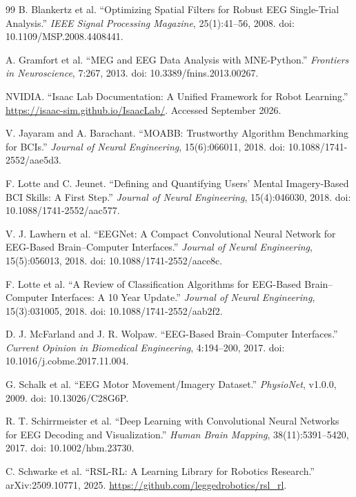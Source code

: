 \documentclass[11pt]{article}
\begin{document}
\begin{thebibliography}{99}\small
{}
B. Blankertz et al. ``Optimizing Spatial Filters for Robust EEG Single-Trial Analysis.'' \emph{IEEE Signal Processing Magazine}, 25(1):41--56, 2008. doi: 10.1109/MSP.2008.4408441.

A. Gramfort et al. ``MEG and EEG Data Analysis with MNE-Python.'' \emph{Frontiers in Neuroscience}, 7:267, 2013. doi: 10.3389/fnins.2013.00267.

NVIDIA. ``Isaac Lab Documentation: A Unified Framework for Robot Learning.'' \url{https://isaac-sim.github.io/IsaacLab/}. Accessed September 2026.

V. Jayaram and A. Barachant. ``MOABB: Trustworthy Algorithm Benchmarking for BCIs.'' \emph{Journal of Neural Engineering}, 15(6):066011, 2018. doi: 10.1088/1741-2552/aae5d3.

F. Lotte and C. Jeunet. ``Defining and Quantifying Users' Mental Imagery-Based BCI Skills: A First Step.'' \emph{Journal of Neural Engineering}, 15(4):046030, 2018. doi: 10.1088/1741-2552/aac577.

V. J. Lawhern et al. ``EEGNet: A Compact Convolutional Neural Network for EEG-Based Brain--Computer Interfaces.'' \emph{Journal of Neural Engineering}, 15(5):056013, 2018. doi: 10.1088/1741-2552/aace8c.

F. Lotte et al. ``A Review of Classification Algorithms for EEG-Based Brain--Computer Interfaces: A 10 Year Update.'' \emph{Journal of Neural Engineering}, 15(3):031005, 2018. doi: 10.1088/1741-2552/aab2f2.

D. J. McFarland and J. R. Wolpaw. ``EEG-Based Brain--Computer Interfaces.'' \emph{Current Opinion in Biomedical Engineering}, 4:194--200, 2017. doi: 10.1016/j.cobme.2017.11.004.

G. Schalk et al. ``EEG Motor Movement/Imagery Dataset.'' \emph{PhysioNet}, v1.0.0, 2009. doi: 10.13026/C28G6P.

R. T. Schirrmeister et al. ``Deep Learning with Convolutional Neural Networks for EEG Decoding and Visualization.'' \emph{Human Brain Mapping}, 38(11):5391--5420, 2017. doi: 10.1002/hbm.23730.

C. Schwarke et al. ``RSL-RL: A Learning Library for Robotics Research.'' arXiv:2509.10771, 2025. \url{https://github.com/leggedrobotics/rsl_rl}.
\end{thebibliography}
\end{document}
